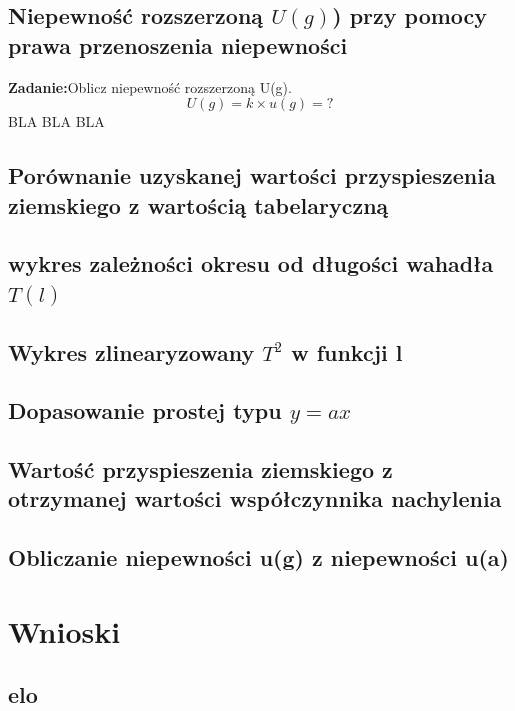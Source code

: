 \documentclass[18pt, twoside]{article}
\begin{document}
 \subsection{Niepewność rozszerzoną \(U(g)\)) przy pomocy prawa przenoszenia niepewności}
\textbf{Zadanie:}Oblicz niepewność rozszerzoną U(g).\newline
\[U(g) = k \times u(g) = ?\]
BLA BLA BLA
 \subsection{Porównanie uzyskanej wartości przyspieszenia ziemskiego z wartością tabelaryczną}
 
 
 \subsection{wykres zależności okresu od długości wahadła \(T(l)\)}
 \subsection{Wykres zlinearyzowany \(T^2\) w funkcji l}
 \subsection{Dopasowanie prostej typu \(y = ax\)}
 \subsection{Wartość przyspieszenia 
ziemskiego z otrzymanej wartości współczynnika nachylenia}
 \subsection{Obliczanie niepewności u(g) z niepewności u(a) }
\section{Wnioski}
\subsection{elo}
\end{document}
